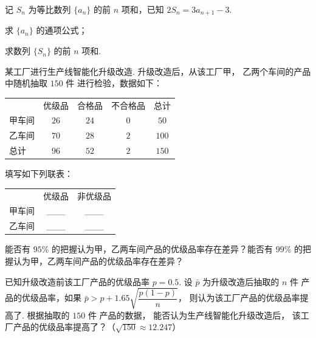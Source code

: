 \documentclass[UTF8,12pt]{ctexart}
\begin{document}
\begin{questions}[start=17]

  \item 记 $S_n$ 为等比数列 $\{a_n\}$ 的前 $n$ 项和，已知 $2S_n=3a_{n+1}-3$.

    \begin{subquestions}
      \item
      求 $\{a_n\}$ 的通项公式；
      \item
      求数列 $\{S_n\}$ 的前 $n$ 项和.
    \end{subquestions}

  \item 某工厂进行生产线智能化升级改造. 升级改造后，从该工厂甲，
    乙两个车间的产品中随机抽取 $150\text{ 件}$ 进行检验，数据如下：

    \begin{center}
      \begin{tabular}{lcccc}
        \toprule
               & 优级品 & 合格品 & 不合格品 & 总计 \\
        甲车间 & $26$   & $24$   & $0$      & $50$ \\
        乙车间 & $70$   & $28$   & $2$      & $100$ \\
        总计   & $96$   & $52$   & $2$      & $150$ \\
        \bottomrule
      \end{tabular}
    \end{center}

    \begin{subquestions}
      \item
      填写如下列联表：

        \begin{center}
          \begin{tabular}{lcc}
            \toprule
                   & 优级品 & 非优级品 \\
            甲车间 & \_\_\_ & \_\_\_ \\
            乙车间 & \_\_\_ & \_\_\_ \\
            \bottomrule
          \end{tabular}
        \end{center}

      能否有 $95\%$ 的把握认为甲，乙两车间产品的优级品率存在差异？能否有 $99\%$
        的把握认为甲，乙两车间产品的优级品率存在差异？
      \item
      已知升级改造前该工厂产品的优级品率 $p=0.5$. 设 $\bar p$ 为升级改造后抽取的
        $n\text{ 件}$ 产品的优级品率，如果 $\bar p>p+1.65\sqrt{\dfrac{p(1-p)}{n}}$，
        则认为该工厂产品的优级品率提高了. 根据抽取的 $150\text{ 件}$ 产品的数据，
        能否认为生产线智能化升级改造后，
        该工厂产品的优级品率提高了？（$\sqrt{150}\approx12.247$）
    \end{subquestions}


\end{questions}
\end{document}
